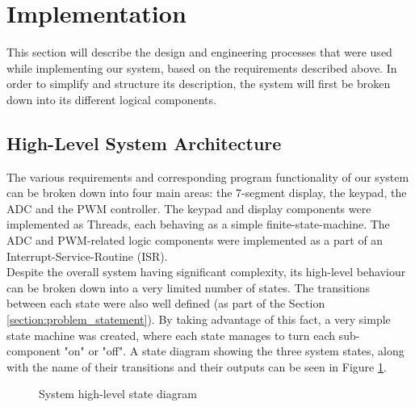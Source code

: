 \section{Implementation}

This section will describe the design and engineering processes that were used while implementing our system, based on the requirements described above. In order to simplify and structure its description, the system will first be broken down into its different logical components.\\


\subsection{High-Level System Architecture}


The various requirements and corresponding program functionality of our system can be broken down into four main areas: the 7-segment display, the keypad, the ADC and the PWM controller. The keypad and display components were implemented as Threads, each behaving as a simple finite-state-machine. The ADC and PWM-related logic components were implemented as a part of an Interrupt-Service-Routine (ISR).\\

Despite the overall system having significant complexity, its high-level behaviour can be broken down into a very limited number of states. The transitions between each state were also well defined (as part of the Section \ref{section:problem_statement}). By taking advantage of this fact, a very simple state machine was created, where each state manages to turn each sub-component "on" or "off". A state diagram showing the three system states, along with the name of their transitions and their outputs can be seen in Figure \ref{fig:high_level_state_diagram}.


\begin{figure}[h]
\centering
{}
\caption{System high-level state diagram}
\label{fig:high_level_state_diagram}
\end{figure}




